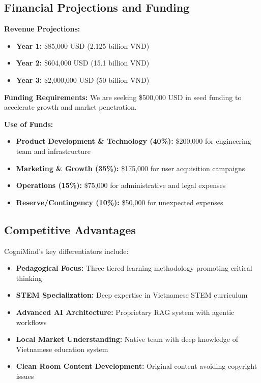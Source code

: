 \subsection{Financial Projections and Funding}
\textbf{Revenue Projections:}
\begin{itemize}
    \item \textbf{Year 1:} \$85,000 USD (2.125 billion VND)
    \item \textbf{Year 2:} \$604,000 USD (15.1 billion VND)
    \item \textbf{Year 3:} \$2,000,000 USD (50 billion VND)
\end{itemize}

\textbf{Funding Requirements:}
We are seeking \$500,000 USD in seed funding to accelerate growth and market penetration.

\textbf{Use of Funds:}
\begin{itemize}
    \item \textbf{Product Development \& Technology (40\%):} \$200,000 for engineering team and infrastructure
    \item \textbf{Marketing \& Growth (35\%):} \$175,000 for user acquisition campaigns
    \item \textbf{Operations (15\%):} \$75,000 for administrative and legal expenses
    \item \textbf{Reserve/Contingency (10\%):} \$50,000 for unexpected expenses
\end{itemize}

\subsection{Competitive Advantages}
CogniMind's key differentiators include:

\begin{itemize}
    \item \textbf{Pedagogical Focus:} Three-tiered learning methodology promoting critical thinking
    \item \textbf{STEM Specialization:} Deep expertise in Vietnamese STEM curriculum
    \item \textbf{Advanced AI Architecture:} Proprietary RAG system with agentic workflows
    \item \textbf{Local Market Understanding:} Native team with deep knowledge of Vietnamese education system
    \item \textbf{Clean Room Content Development:} Original content avoiding copyright issues
\end{itemize}

